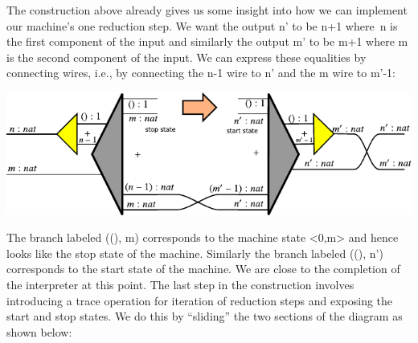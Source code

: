 \documentclass{llncs}
\begin{document}
The construction above already gives us some insight into how we can
implement our machine's one reduction step. We want the output {{n'}} to be
{{n+1}} where~{{n}} is the first component of the input and similarly the
output {{m'}} to be {{m+1}} where {{m}} is the second component of the input.
We can express these equalities by connecting wires, i.e., by connecting the
{{n-1}} wire to {{n'}} and the {{m}} wire to {{m'-1}}:

\begin{center}
  \includegraphics{diagrams/nat-nat5.pdf}
\end{center}






The branch labeled {{((), m)}} corresponds to the machine state {{<0,m>}} and
hence looks like the stop state of the machine. Similarly the branch labeled
{{((), n')}} corresponds to the start state of the machine. We are close to
the completion of the interpreter at this point. The last step in the
construction involves introducing a {{trace}} operation for iteration of
reduction steps and exposing the start and stop states. We do this by
``sliding'' the two sections of the diagram as shown below:
\end{document}
